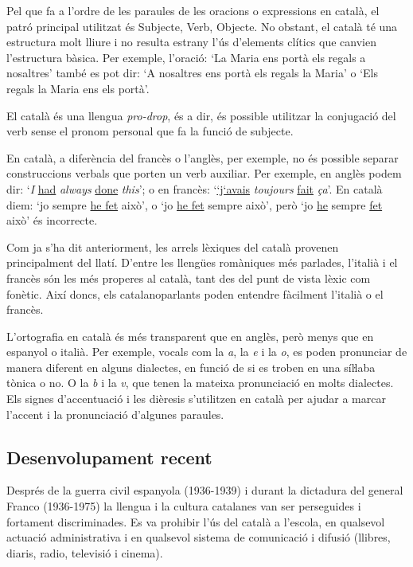 \documentclass[]{../../metanetpaper}
\begin{document}
\begin{multicols}{2}
Pel que fa a l’ordre de les paraules de les oracions o expressions en català, el patró principal utilitzat és Subjecte, Verb, Objecte. No obstant, el català té una estructura molt lliure i no resulta estrany l’ús d’elements clítics que canvien l’estructura bàsica. Per exemple, l’oració: ‘La Maria ens portà els regals a nosaltres’ també es pot dir: ‘A nosaltres ens portà els regals la Maria’ o ‘Els regals la Maria ens els portà’.

El català és una llengua \textit{pro-drop}, és a dir, és possible utilitzar la conjugació del verb sense el pronom personal que fa la funció de subjecte. 

En català, a diferència del francès o l’anglès, per exemple, no és possible separar construccions verbals que porten un verb auxiliar. Per exemple, en anglès podem dir: ‘\textit{I} \underline{had} \textit{always} \underline{done} \textit{this}’; o en francès: ‘\underline{‘j‘avais} \textit{toujours} \underline{fait}  \textit{ça}’. En català diem: ‘jo sempre \underline{he fet} això’, o ‘jo \underline{he fet} sempre això’, però ‘jo \underline{he} sempre \underline{fet} això’ és incorrecte.

Com ja s’ha dit anteriorment, les arrels lèxiques del català provenen principalment del llatí. D’entre les llengües romàniques més parlades, l’italià i el francès són les més properes al català, tant des del punt de vista lèxic com fonètic. Així doncs, els catalanoparlants poden entendre fàcilment l’italià o el francès. 

L’ortografia en català és més transparent que en anglès, però menys que en espanyol o italià. Per exemple, vocals com la \textit{a}, la \textit{e} i la \textit{o}, es poden pronunciar de manera diferent en alguns dialectes, en funció de si es troben en una síŀlaba tònica o no. O la \textit{b} i la \textit{v}, que tenen la mateixa pronunciació en molts dialectes. Els signes d’accentuació i les dièresis s’utilitzen en català per ajudar a marcar l’accent i la pronunciació d’algunes paraules.

\subsection{Desenvolupament recent}

Després de la guerra civil espanyola (1936-1939) i durant la dictadura del general Franco (1936-1975) la llengua i la cultura catalanes van ser perseguides i fortament discriminades. Es va prohibir l’ús del català a l’escola, en qualsevol actuació administrativa i en qualsevol sistema de comunicació i difusió (llibres, diaris, radio, televisió i cinema).


\end{multicols}
\end{document}

